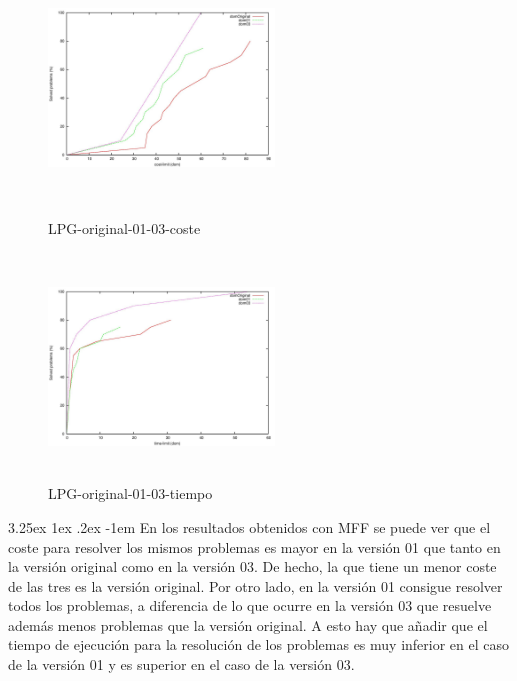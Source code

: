 \documentclass{article}
\makeatletter
\renewcommand\paragraph{\@startsection{paragraph}{5}{\z@}%
  {3.25ex \@plus1ex \@minus.2ex}%
  {-1em}%
  {\normalfont\normalsize\bfseries}}
\makeatother
\begin{document}
\begin{figure}[!htb]
   \begin{minipage}{0.48\textwidth}
     \centering
     \includegraphics[width=6cm, height=6cm]{lpg-or-01-03-cost}
    \caption{LPG-original-01-03-coste}
   \end{minipage}\hfill
   \begin {minipage}{0.48\textwidth}
     \centering
     \includegraphics[width=6cm, height=6cm]{lpg-or-01-03-time}
    \caption{LPG-original-01-03-tiempo}
   \end{minipage}
\end{figure}

\paragraph{}
En los resultados obtenidos con MFF se puede ver que el coste para resolver los mismos problemas es mayor en la versión 01 que tanto en la versión original como en la versión 03. De hecho, la que tiene un menor coste de las tres es la versión original. Por otro lado, en la versión 01 consigue resolver todos los problemas, a diferencia de lo que ocurre en la versión 03 que resuelve además menos problemas que la versión original. A esto hay que añadir que el tiempo de ejecución para la resolución de los problemas es muy inferior en el caso de la versión 01 y es superior en el caso de la versión 03.
\end{document}
